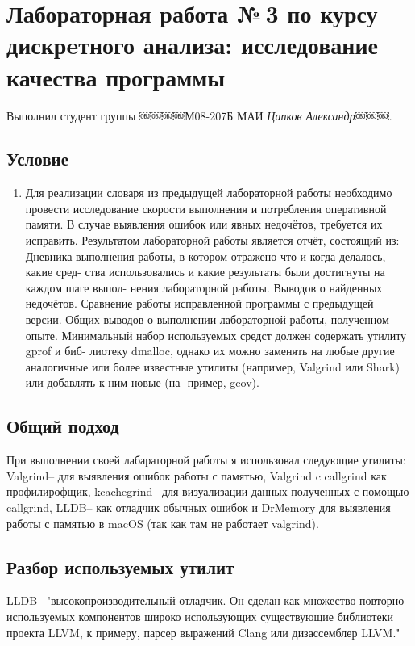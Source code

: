 \documentclass[12pt]{article}
\begin{document}
\section*{Лабораторная работа №\,3 по курсу дискрeтного анализа: исследование качества программы}

Выполнил студент группы ￼￼￼￼М08-207Б МАИ \textit{Цапков Александр￼￼￼}.

\subsection*{Условие}

\begin{enumerate}
\item Для реализации словаря из предыдущей лабораторной работы необходимо провести исследование скорости выполнения и потребления оперативной памяти. В случае выявления ошибок или явных недочётов, требуется их исправить.
Результатом лабораторной работы является отчёт, состоящий из:
Дневника выполнения работы, в котором отражено что и когда делалось, какие сред- ства использовались и какие результаты были достигнуты на каждом шаге выпол- нения лабораторной работы.
Выводов о найденных недочётов.
Сравнение работы исправленной программы с предыдущей версии. Общих выводов о выполнении лабораторной работы, полученном опыте.
Минимальный набор используемых средст должен содержать утилиту gprof и биб- лиотеку dmalloc, однако их можно заменять на любые другие аналогичные или более известные утилиты (например, Valgrind или Shark) или добавлять к ним новые (на- пример, gcov).
\end{enumerate}

\subsection*{Общий подход}

При выполнении своей лабараторной работы я использовал следующие утилиты: Valgrind-- для выявления ошибок работы с памятью, Valgrind c callgrind как профилирофщик, kcachegrind-- для визуализации данных полученных с помощью callgrind, LLDB-- как отладчик обычных ошибок и DrMemory для выявления работы с памятью в macOS (так как там не работает valgrind).

\subsection*{Разбор используемых утилит}

LLDB-- "высокопроизводительный отладчик. Он сделан как множество повторно используемых компонентов широко использующих существующие библиотеки проекта LLVM, к примеру, парсер выражений Clang или дизассемблер LLVM."
\end{document}
